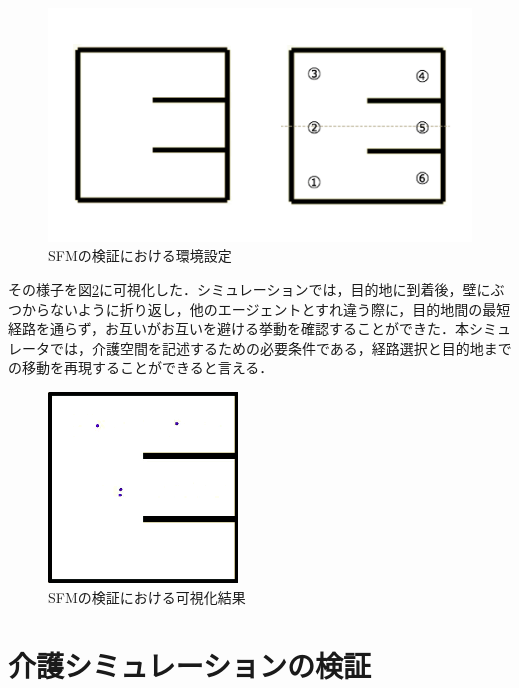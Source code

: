 \begin{figure}[htb]
\begin{center}
 \includegraphics[scale=0.6]{figures/SFM_environment}
 \caption[SFMの検証における環境設定]{SFMの検証における環境設定 \label{SFM_environment}}
\end{center}
\end{figure}

その様子を図\ref{SFM_visual}に可視化した．シミュレーションでは，目的地に到着後，壁にぶつからないように折り返し，他のエージェントとすれ違う際に，目的地間の最短経路を通らず，お互いがお互いを避ける挙動を確認することができた．本シミュレータでは，介護空間を記述するための必要条件である，経路選択と目的地までの移動を再現することができると言える．

\begin{figure}[htb]
\begin{center}
 \includegraphics[scale=0.6]{figures/SFM_visual}
 \caption[SFMの検証における可視化結果]{SFMの検証における可視化結果 \label{SFM_visual}}
\end{center}
\end{figure}

\section{介護シミュレーションの検証}

